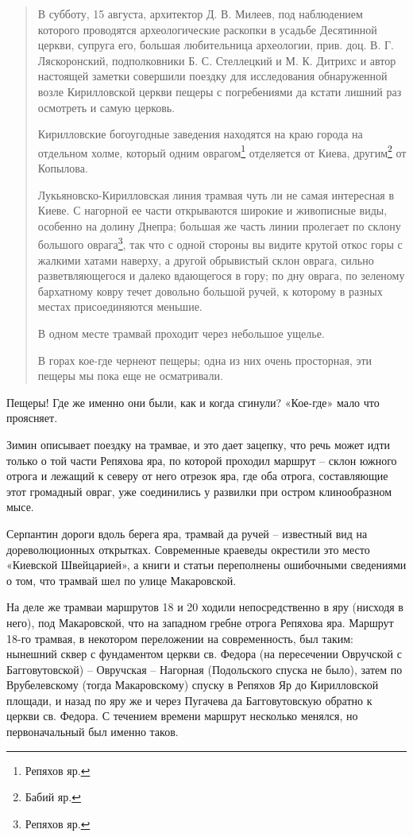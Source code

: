 \begin{quotation}
В субботу, 15 августа, архитектор Д. В. Милеев, под наблюдением которого проводятся археологические раскопки в усадьбе Десятинной церкви, супруга его, большая любительница археологии, прив. доц. В. Г. Ляскоронский, подполковники Б. С. Стеллецкий и М. К. Дитрихс и автор настоящей заметки совершили поездку для исследования обнаруженной возле Кирилловской церкви пещеры с погребениями да кстати лишний раз осмотреть и самую церковь.

Кирилловские богоугодные заведения находятся на краю города на отдельном холме, который одним оврагом\footnote{Репяхов яр.} отделяется от Киева, другим\footnote{Бабий яр.} от Копылова.

Лукьяновско-Кирилловская линия трамвая чуть ли не самая интересная в Киеве. С нагорной ее части открываются широкие и живописные виды, особенно на долину Днепра; большая же часть линии пролегает по склону большого оврага\footnote{Репяхов яр.}, так что с одной стороны вы видите крутой откос горы с жалкими хатами наверху, а другой обрывистый склон оврага, сильно разветвляющегося и далеко вдающегося в гору; по дну оврага, по зеленому бархатному ковру течет довольно большой ручей, к которому в разных местах присоединяются меньшие.

В одном месте трамвай проходит через небо\-льшое ущелье.

В горах кое-где чернеют пещеры; одна из них очень просторная, эти пещеры мы пока еще не осматривали.
\end{quotation} 

Пещеры! Где же именно они были, как и когда сгинули? «Кое-где» мало что проясняет.

Зимин описывает поездку на трамвае, и это дает зацепку, что речь может идти только о той части Репяхова яра, по которой проходил маршрут – склон южного отрога и лежащий к северу от него отрезок яра, где оба отрога, составляющие этот громадный овраг, уже соединились у развилки при остром клинообразном мысе.

Серпантин дороги вдоль берега яра, трамвай да ручей – известный вид на дореволюционных открытках. Современные краеведы окрестили это место «Киевской Швейцарией», а книги и статьи переполнены ошибочными сведениями о том, что трамвай шел по улице Макаровской.

На деле же трамваи маршрутов 18 и 20 ходили непосредственно в яру (нисходя в него), под Макаровской, что на западном гребне отрога Репяхова яра. Маршрут 18-го трамвая, в некотором переложении на современность, был таким: нынешний сквер с фундаментом церкви св. Федора (на пересечении Овручской с Багговутовской) – Овручская – Нагорная (Подольского спуска не было), затем по Врубелевскому (тогда Макаровскому) спуску в Репяхов Яр до Кирилловской площади, и назад по яру же и через Пугачева да Багговутовскую обратно к церкви св. Федора. С течением времени маршрут несколько менялся, но первоначальный был именно таков.

